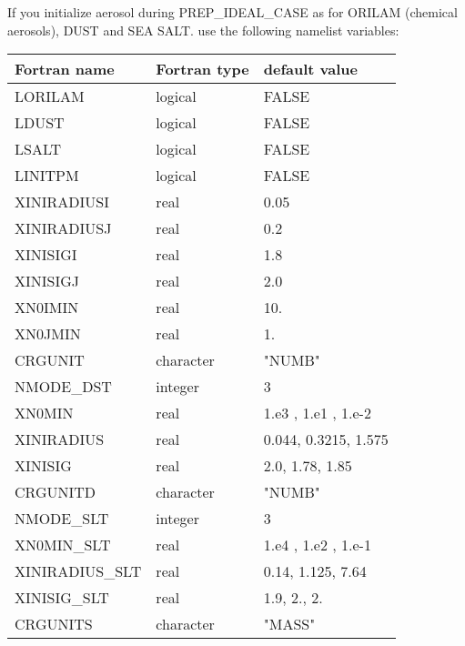 If you initialize aerosol during PREP\_IDEAL\_CASE as for ORILAM (chemical aerosols), DUST and SEA SALT.
use the following namelist variables:
\begin{center}
\begin{tabular} {|l|l|l|}
\hline
Fortran name & Fortran type & default value \\
\hline
LORILAM      & logical       & FALSE    \\
LDUST        & logical       & FALSE    \\
LSALT        & logical       & FALSE    \\
LINITPM      & logical       & FALSE    \\
XINIRADIUSI  & real          & 0.05     \\
XINIRADIUSJ  & real          & 0.2      \\
XINISIGI     & real          & 1.8      \\
XINISIGJ     & real          & 2.0      \\
XN0IMIN      & real          & 10.      \\
XN0JMIN      & real          & 1.       \\
CRGUNIT      & character     & "NUMB"   \\
NMODE\_DST   & integer       & 3       \\
XN0MIN       & real          & 1.e3 , 1.e1 , 1.e-2 \\
XINIRADIUS   & real          & 0.044, 0.3215, 1.575 \\
XINISIG      & real          & 2.0, 1.78, 1.85 \\
CRGUNITD     & character     & "NUMB"   \\
NMODE\_SLT   & integer       & 3       \\
XN0MIN\_SLT  & real          & 1.e4 , 1.e2 , 1.e-1 \\
XINIRADIUS\_SLT & real       & 0.14, 1.125,  7.64\\
XINISIG\_SLT    & real       & 1.9, 2., 2. \\
CRGUNITS     & character     & "MASS"   \\
\hline
\end{tabular}
\end{center}

